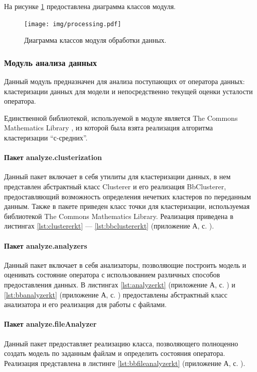 На рисунке \ref{fig:processingUml} предоставлена диаграмма классов модуля.
\begin{figure}[H]
	\centering
	\texttt{[image: img/processing.pdf]}
	\caption{Диаграмма классов модуля обработки данных.}
	\label{fig:processingUml}
\end{figure}

\subsubsection{Модуль анализа данных}
Данный модуль предназначен для анализа поступающих от оператора \newline данных: кластеризации данных для модели и непосредственно текущей оценки усталости оператора.

Единственной библиотекой, используемой в модуле является \foreignlanguage{english}{The Commons Mathematics Library} \cite{apachemath3}, из которой была взята реализация алгоритма кластеризации ``с-средних''.

\paragraph{Пакет analyze.clusterization \newline}

Данный пакет включает в себя утилиты для кластеризации данных, в нем представлен абстрактный класс Clusterer и его реализация BbClusterer, предоставляющий возможность определения нечетких кластеров по переданным \newline данным. Также в пакете приведен класс точки для кластеризации, используемая библиотекой The Commons Mathematics Library. Реализация приведена в листингах \ref{lst:clustererkt} --- \ref{lst:bbclustererkt} (приложение А, с. \pageref{chp:application-a}).

\paragraph{Пакет analyze.analyzers}

Данный пакет включает в себя анализаторы, позволяющие построить модель и оценивать состояние оператора с использованием различных способов предоставления данных. В листингах \ref{lst:analyzerkt} (приложение А, с. \pageref{chp:application-a}) и \ref{lst:bbanalyzerkt} (приложение А, с. \pageref{chp:application-a}) предоставлены абстрактный класс анализатора и его реализация для работы с файлами.

\paragraph{Пакет analyze.fileAnalyzer}
Данный пакет предоставляет реализацию класса, позволяющего полноценно создать модель по заданным файлам и определить состояния оператора. Реализация представлена в листинге \ref{lst:bbfileanalyzerkt} (приложение А, с. \pageref{chp:application-a}).


